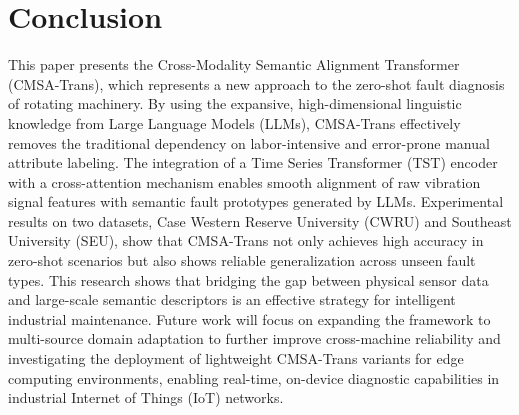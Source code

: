 \section{Conclusion}
This paper presents the Cross-Modality Semantic Alignment Transformer (CMSA-Trans), which represents a new approach to the zero-shot fault diagnosis of rotating machinery. By using the expansive, high-dimensional linguistic knowledge from Large Language Models (LLMs), CMSA-Trans effectively removes the traditional dependency on labor-intensive and error-prone manual attribute labeling. The integration of a Time Series Transformer (TST) encoder with a cross-attention mechanism enables smooth alignment of raw vibration signal features with semantic fault prototypes generated by LLMs. Experimental results on two datasets, Case Western Reserve University (CWRU) and Southeast University (SEU), show that CMSA-Trans not only achieves high accuracy in zero-shot scenarios but also shows reliable generalization across unseen fault types. This research shows that bridging the gap between physical sensor data and large-scale semantic descriptors is an effective strategy for intelligent industrial maintenance. Future work will focus on expanding the framework to multi-source domain adaptation to further improve cross-machine reliability and investigating the deployment of lightweight CMSA-Trans variants for edge computing environments, enabling real-time, on-device diagnostic capabilities in industrial Internet of Things (IoT) networks.
